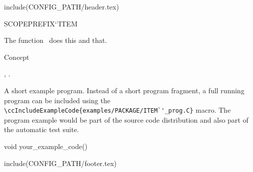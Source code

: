 include(CONFIG_PATH/header.tex)
\begin{ccRefFunction}SCOPE{PREFIX`'ITEM}  %


\ccDefinition
  
The function \ccRefName\ does this and that.



\ccIsModel

Concept

\ccSeeAlso

,
.

\ccExample

A short example program.
Instead of a short program fragment, a full running program can be
included using the 
\verb|\ccIncludeExampleCode{examples/PACKAGE/ITEM`'_prog.C}| 
macro. The program example would be part of the source code distribution and
also part of the automatic test suite.

\begin{ccExampleCode}
void your_example_code() {
}
\end{ccExampleCode}


\end{ccRefFunction}

include(CONFIG_PATH/footer.tex)
